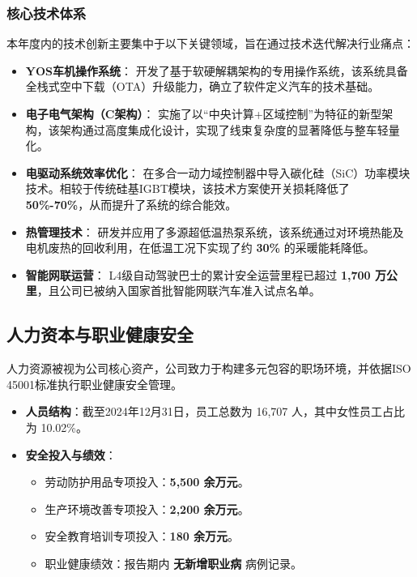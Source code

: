 \documentclass[a4paper,12pt]{article}
\begin{document}
\subsubsection{核心技术体系}
本年度内的技术创新主要集中于以下关键领域，旨在通过技术迭代解决行业痛点：

\begin{itemize}
    \item \textbf{YOS车机操作系统}：
    开发了基于软硬解耦架构的专用操作系统，该系统具备全栈式空中下载（OTA）升级能力，确立了软件定义汽车的技术基础。
    \item \textbf{电子电气架构（C架构）}：
    实施了以“中央计算+区域控制”为特征的新型架构，该架构通过高度集成化设计，实现了线束复杂度的显著降低与整车轻量化。
    \item \textbf{电驱动系统效率优化}：
    在多合一动力域控制器中导入碳化硅（SiC）功率模块技术。相较于传统硅基IGBT模块，该技术方案使开关损耗降低了 \textbf{50\%-70\%}，从而提升了系统的综合能效。
    \item \textbf{热管理技术}：
    研发并应用了多源超低温热泵系统，该系统通过对环境热能及电机废热的回收利用，在低温工况下实现了约 \textbf{30\%} 的采暖能耗降低。
    \item \textbf{智能网联运营}：
    L4级自动驾驶巴士的累计安全运营里程已超过 \textbf{1,700 万公里}，且公司已被纳入国家首批智能网联汽车准入试点名单。
\end{itemize}

\subsection{人力资本与职业健康安全}
人力资源被视为公司核心资产，公司致力于构建多元包容的职场环境，并依据ISO 45001标准执行职业健康安全管理。

\begin{itemize}
    \item \textbf{人员结构}：截至2024年12月31日，员工总数为 16,707 人，其中女性员工占比为 10.02\%。
    \item \textbf{安全投入与绩效}：
    \begin{itemize}
        \item 劳动防护用品专项投入：\textbf{5,500 余万元}。
        \item 生产环境改善专项投入：\textbf{2,200 余万元}。
        \item 安全教育培训专项投入：\textbf{180 余万元}。
        \item 职业健康绩效：报告期内 \textbf{无新增职业病} 病例记录。
    \end{itemize}
\end{itemize}
\end{document}
